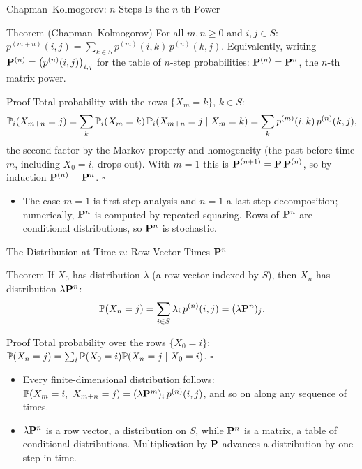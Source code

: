 \begin{frame}{Chapman--Kolmogorov: $n$ Steps Is the $n$-th Power}
  \label{fr:ck}
  \small
  \begin{block}{Theorem (Chapman--Kolmogorov)}
    For all $m,n\ge0$ and $i,j\in S$: \quad $\displaystyle p^{(m+n)}(i,j)=\sum_{k\in S}p^{(m)}(i,k)\,p^{(n)}(k,j)$. \quad Equivalently, writing $\mathbf{P}^{(n)}=\big(p^{(n)}(i,j)\big)_{i,j}$ for the table of $n$-step probabilities: $\mathbf{P}^{(n)}=\mathbf{P}^n$, the $n$-th matrix power.
  \end{block}
  \begin{block}{Proof}
    Total probability with the rows $\{X_m=k\}$, $k\in S$:
    \[
      \mathbb{P}_i(X_{m+n}=j)=\sum_k\mathbb{P}_i(X_m=k)\,\mathbb{P}_i(X_{m+n}=j\mid X_m=k)=\sum_k p^{(m)}(i,k)\,p^{(n)}(k,j),
    \]
    the second factor by the Markov property and homogeneity (the past before time $m$, including $X_0=i$, drops out). With $m=1$ this is $\mathbf{P}^{(n+1)}=\mathbf{P}\,\mathbf{P}^{(n)}$, so by induction $\mathbf{P}^{(n)}=\mathbf{P}^n$. \hfill$\square$
  \end{block}
  \begin{itemize}
    \item The case $m=1$ is first-step analysis and $n=1$ a last-step decomposition; numerically, $\mathbf{P}^n$ is computed by repeated squaring. Rows of $\mathbf{P}^n$ are conditional distributions, so $\mathbf{P}^n$ is stochastic.
  \end{itemize}
\end{frame}

\begin{frame}{The Distribution at Time $n$: Row Vector Times $\mathbf{P}^n$}
  \label{fr:lawn}
  \small
  \begin{block}{Theorem}
    If $X_0$ has distribution $\lambda$ (a row vector indexed by $S$), then $X_n$ has distribution $\lambda\mathbf{P}^n$:
    \[
      \mathbb{P}(X_n=j)=\sum_{i\in S}\lambda_i\,p^{(n)}(i,j)=(\lambda\mathbf{P}^n)_j .
    \]
  \end{block}
  \begin{block}{Proof}
    Total probability over the rows $\{X_0=i\}$: $\mathbb{P}(X_n=j)=\sum_i\mathbb{P}(X_0=i)\mathbb{P}(X_n=j\mid X_0=i)$. \hfill$\square$
  \end{block}
  \begin{itemize}
    \item Every finite-dimensional distribution follows: $\Prob(X_m=i,\ X_{m+n}=j)=(\lambda\PP^m)_i\,p^{(n)}(i,j)$, and so on along any sequence of times.
    \item $\lambda\mathbf{P}^n$ is a row vector, a distribution on $S$, while $\mathbf{P}^n$ is a matrix, a table of conditional distributions. Multiplication by $\mathbf{P}$ advances a distribution by one step in time.
  \end{itemize}
\end{frame}

